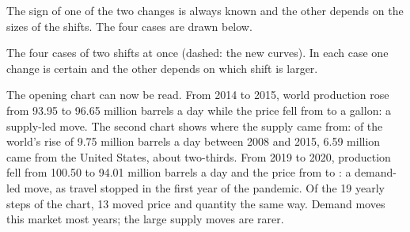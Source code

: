 The sign of one of the two changes is always known and the other depends on the sizes of the shifts. The four cases are drawn below.

\begin{omfigure}

{\small The four cases of two shifts at once (dashed: the new curves). In each case one change is certain and the other depends on which
shift is larger.}
\end{omfigure}

The opening chart can now be read. From 2014 to 2015, world production rose from 93.95 to 96.65 million barrels a day while the price fell
from  to  a gallon: a supply-led move. The second chart shows where the supply came from: of the world's rise of 9.75
million barrels a day between 2008 and 2015, 6.59 million came from the United States, about two-thirds. From 2019 to 2020, production fell
from 100.50 to 94.01 million barrels a day and the price from  to : a demand-led move, as travel stopped in the first
year of the pandemic. Of the 19 yearly steps of the chart, 13 moved price and quantity the same way. Demand moves this market most years;
the large supply moves are rarer.

